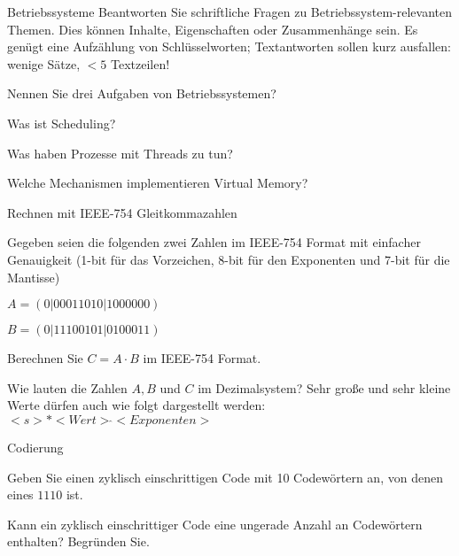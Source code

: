 \documentclass{exercisesheet}
\begin{document}
\begin{exercise*}[14]{Betriebssysteme}{
    Beantworten Sie schriftliche Fragen zu Betriebssystem-relevanten Themen. Dies können Inhalte, Eigenschaften oder Zusammenhänge sein. Es genügt eine Aufzählung von Schlüsselworten; Textantworten sollen kurz ausfallen: wenige Sätze, $<5$ Textzeilen!
  }
  \item Nennen Sie drei Aufgaben von Betriebssystemen?
  \item Was ist Scheduling?
  \item Was haben Prozesse mit Threads zu tun?
  \item Welche Mechanismen implementieren Virtual Memory?
\end{exercise*}

\begin{exercise*}[4]{Rechnen mit IEEE-754 Gleitkommazahlen}{
    Gegeben seien die folgenden zwei Zahlen im IEEE-754 Format mit einfacher Genauigkeit (1-bit für das Vorzeichen, 8-bit für den Exponenten und 7-bit für die Mantisse)\par
    \centering $A = (0|00011010|1000000)$\par $B = (0|11100101|0100011)$
  }
  \item Berechnen Sie $C = A \cdot B$ im IEEE-754 Format.
  \item Wie lauten die Zahlen $A, B$ und $C$ im Dezimalsystem? Sehr große und sehr kleine Werte dürfen auch wie folgt dargestellt werden: $<s>*<Wert> \hat{} <Exponenten>$
\end{exercise*}

\begin{exercise**}{Codierung}
  \item Geben Sie einen zyklisch einschrittigen Code mit 10 Codewörtern an, von denen eines $1110$ ist.
  \item Kann ein zyklisch einschrittiger Code eine ungerade Anzahl an Codewörtern enthalten? Begründen Sie.
\end{exercise**}
\end{document}
